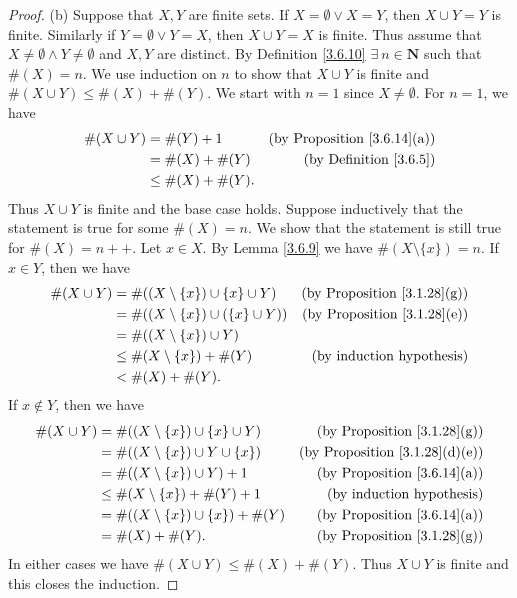 \begin{proof}{(b)}
    Suppose that \(X, Y\) are finite sets.
    If \(X = \emptyset \lor X = Y\), then \(X \cup Y = Y\) is finite.
    Similarly if \(Y = \emptyset \lor Y = X\), then \(X \cup Y = X\) is finite.
    Thus assume that \(X \neq \emptyset \land Y \neq \emptyset\) and \(X, Y\) are distinct.
    By Definition \ref{3.6.10} \(\exists\ n \in \mathbf{N}\) such that \(\#(X) = n\).
    We use induction on \(n\) to show that \(X \cup Y\) is finite and \(\#(X \cup Y) \leq \#(X) + \#(Y)\).
    We start with \(n = 1\) since \(X \neq \emptyset\).
    For \(n = 1\), we have
    \begin{align*}
        \#(X \cup Y) & = \#(Y) + 1         & \text{(by Proposition \ref{3.6.14}(a))} \\
                     & = \#(X) + \#(Y)     & \text{(by Definition \ref{3.6.5})}      \\
                     & \leq \#(X) + \#(Y).
    \end{align*}
    Thus \(X \cup Y\) is finite and the base case holds.
    Suppose inductively that the statement is true for some \(\#(X) = n\).
    We show that the statement is still true for \(\#(X) = n++\).
    Let \(x \in X\).
    By Lemma \ref{3.6.9} we have \(\#(X \setminus \{x\}) = n\).
    If \(x \in Y\), then we have
    \begin{align*}
        \#(X \cup Y) & = \#((X \setminus \{x\}) \cup \{x\} \cup Y)   & \text{(by Proposition \ref{3.1.28}(g))} \\
                     & = \#((X \setminus \{x\}) \cup (\{x\} \cup Y)) & \text{(by Proposition \ref{3.1.28}(e))} \\
                     & = \#((X \setminus \{x\}) \cup Y)                                                        \\
                     & \leq \#(X \setminus \{x\}) + \#(Y)            & \text{(by induction hypothesis)}        \\
                     & < \#(X) + \#(Y).
    \end{align*}
    If \(x \notin Y\), then we have
    \begin{align*}
        \#(X \cup Y) & = \#((X \setminus \{x\}) \cup \{x\} \cup Y)  & \text{(by Proposition \ref{3.1.28}(g))}    \\
                     & = \#((X \setminus \{x\}) \cup Y \cup \{x\})  & \text{(by Proposition \ref{3.1.28}(d)(e))} \\
                     & = \#((X \setminus \{x\}) \cup Y) + 1         & \text{(by Proposition \ref{3.6.14}(a))}    \\
                     & \leq \#(X \setminus \{x\}) + \#(Y) + 1       & \text{(by induction hypothesis)}           \\
                     & = \#((X \setminus \{x\}) \cup \{x\}) + \#(Y) & \text{(by Proposition \ref{3.6.14}(a))}    \\
                     & = \#(X) + \#(Y).                             & \text{(by Proposition \ref{3.1.28}(g))}
    \end{align*}
    In either cases we have \(\#(X \cup Y) \leq \#(X) + \#(Y)\).
    Thus \(X \cup Y\) is finite and this closes the induction.


\end{proof}
